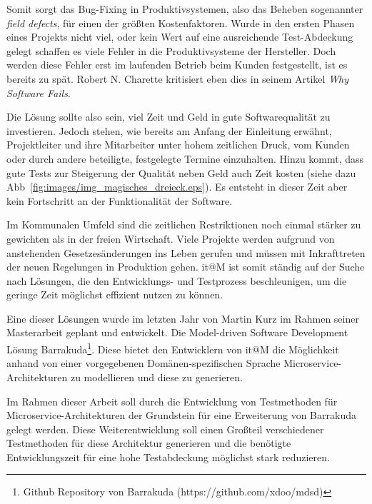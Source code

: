 \documentclass[12pt,a4paper,bibliography=totocnumbered,listof=totocnumbered]{scrartcl}
\begin{document}
Somit sorgt das Bug-Fixing in Produktivsystemen, also das Beheben sogenannter \textit{field defects}, für einen der größten Kostenfaktoren. Wurde in den ersten Phasen eines Projekts nicht viel, oder kein Wert auf eine ausreichende Test-Abdeckung gelegt schaffen es viele Fehler in die Produktivsysteme der Hersteller. Doch werden diese Fehler erst im laufenden Betrieb beim Kunden festgestellt, ist es bereits zu spät. Robert N. Charette kritisiert eben dies in seinem Artikel \textit{Why Software Fails}\cite{charette}.


Die Lösung sollte also sein, viel Zeit und Geld in gute Softwarequalität zu investieren. Jedoch stehen, wie bereits am Anfang der Einleitung erwähnt, Projektleiter und ihre Mitarbeiter unter hohem zeitlichen Druck, vom Kunden oder durch andere beteiligte, festgelegte Termine einzuhalten. Hinzu kommt, dass gute Tests zur Steigerung der Qualität neben Geld auch Zeit kosten (siehe dazu Abb~\ref{fig:images/img_magisches_dreieck.eps}). Es entsteht in dieser Zeit aber kein Fortschritt an der Funktionalität der Software.

Im Kommunalen Umfeld sind die zeitlichen Restriktionen noch einmal stärker zu gewichten als in der freien Wirtschaft. Viele Projekte werden aufgrund von anstehenden Gesetzesänderungen ins Leben gerufen und müssen mit Inkrafttreten der neuen Regelungen in Produktion gehen. it@M ist somit ständig auf der Suche nach Lösungen, die den Entwicklungs- und Testprozess beschleunigen, um die geringe Zeit möglichst effizient nutzen zu können.

Eine dieser Lösungen wurde im letzten Jahr von Martin Kurz im Rahmen seiner Masterarbeit \cite{mkthesis} geplant und entwickelt. Die Model-driven Software Development Lösung Barrakuda\footnote{Github Repository von Barrakuda (https://github.com/xdoo/mdsd)}. Diese bietet den Entwicklern von it@M die Möglichkeit anhand von einer vorgegebenen Domänen-spezifischen Sprache Microservice-Architekturen zu modellieren und diese zu generieren.

Im Rahmen dieser Arbeit soll durch die Entwicklung von Testmethoden für Microservice-Architekturen der Grundstein für eine Erweiterung von Barrakuda gelegt werden. Diese Weiterentwicklung soll einen Großteil verschiedener Testmethoden für diese Architektur generieren und die benötigte Entwicklungszeit für eine hohe Testabdeckung möglichst stark reduzieren.
\end{document}
